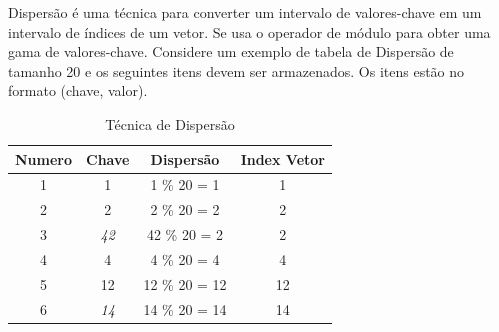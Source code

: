 \documentclass[a4paper, 12pt]{article}
\begin{document}
Dispersão é uma técnica para converter um intervalo de valores-chave em um intervalo de índices de um vetor. Se usa o operador de módulo para obter uma gama de valores-chave. Considere um exemplo de tabela de Dispersão de tamanho 20 e os seguintes itens devem ser armazenados. Os itens estão no formato (chave, valor).
\begin{longtable}[c]{cccc}
	\caption{Técnica de Dispersão 
	}
	\label{tab:rash-table}\\
	\hline
	{\color[HTML]{000000} \textbf{Numero}} &
	{\color[HTML]{000000} \textbf{Chave}} &
	{\color[HTML]{000000} \textbf{Dispersão}} &
	{\color[HTML]{000000} \textbf{Index Vetor}} \\ \hline
	\endfirsthead
	\endhead
	\multicolumn{1}{|c|}{{\color[HTML]{000000} 1}} &
	\multicolumn{1}{c|}{{\color[HTML]{000000} 1}} &
	\multicolumn{1}{c|}{{\color[HTML]{000000} 1 \% 20 = 1}} &
	\multicolumn{1}{c|}{{\color[HTML]{000000} 1}} \\ \hline
	\multicolumn{1}{|c|}{{\color[HTML]{000000} 2}} &
	\multicolumn{1}{c|}{{\color[HTML]{000000} 2}} &
	\multicolumn{1}{c|}{{\color[HTML]{000000} 2 \% 20 = 2}} &
	\multicolumn{1}{c|}{{\color[HTML]{000000} 2}} \\ \hline
	\multicolumn{1}{|c|}{{\color[HTML]{000000} 3}} &
	\multicolumn{1}{c|}{{\color[HTML]{000000} \textit{42}}} &
	\multicolumn{1}{c|}{{\color[HTML]{000000} 42 \% 20 = 2}} &
	\multicolumn{1}{c|}{{\color[HTML]{000000} 2}} \\ \hline
	\multicolumn{1}{|c|}{{\color[HTML]{000000} 4}} &
	\multicolumn{1}{c|}{{\color[HTML]{000000} 4}} &
	\multicolumn{1}{c|}{{\color[HTML]{000000} 4 \% 20 = 4}} &
	\multicolumn{1}{c|}{{\color[HTML]{000000} 4}} \\ \hline
	\multicolumn{1}{|c|}{{\color[HTML]{000000} 5}} &
	\multicolumn{1}{c|}{{\color[HTML]{000000} 12}} &
	\multicolumn{1}{c|}{{\color[HTML]{000000} 12 \% 20 = 12}} &
	\multicolumn{1}{c|}{{\color[HTML]{000000} 12}} \\ \hline
	\multicolumn{1}{|c|}{{\color[HTML]{000000} 6}} &
	\multicolumn{1}{c|}{{\color[HTML]{000000} \textit{14}}} &
	\multicolumn{1}{c|}{{\color[HTML]{000000} 14 \% 20 = 14}} &
	\multicolumn{1}{c|}{{\color[HTML]{000000} 14}} \\ \hline

\end{longtable}
\end{document}
